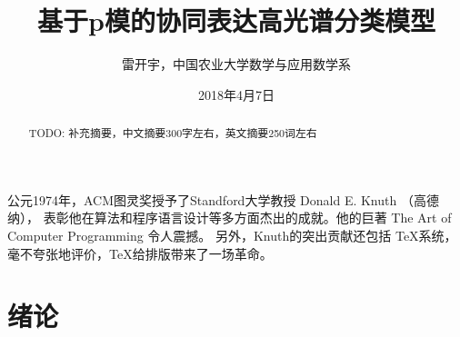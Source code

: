 \documentclass[12pt,a4paper]{article}
\begin{document}
\newtheorem{example}{例}             %
\newtheorem{theorem}{定理}[section]  %
\newtheorem{definition}{定义}
\newtheorem{axiom}{公理}
\newtheorem{property}{性质}
\newtheorem{proposition}{命题}
\newtheorem{lemma}{引理}
\newtheorem{corollary}{推论}
\newtheorem{remark}{注解}
\newtheorem{condition}{条件}
\newtheorem{conclusion}{结论}
\newtheorem{assumption}{假设}

\renewcommand{\contentsname}{目录}     %
\renewcommand{\abstractname}{摘要}     %
\renewcommand{\refname}{参考文献}      %
\renewcommand{\indexname}{索引}
\renewcommand{\figurename}{图}
\renewcommand{\tablename}{表}
\renewcommand{\appendixname}{附录}
\renewcommand{\proofname}{证明}
\renewcommand{\algorithmicrequire}{ \textbf{输入:}} %
\renewcommand{\algorithmicensure}{ \textbf{输出:}} %
\renewcommand{\algorithmicrepeat}{ \textbf{循环:}} 
\renewcommand{\algorithmicuntil}{ \textbf{循环停止条件:}} 

\title{基于p模的协同表达高光谱分类模型}
\author{雷开宇，中国农业大学数学与应用数学系}
\date{2018年4月7日}
\maketitle                            %
\tableofcontents                      %
\thispagestyle{empty}                 %

\begin{abstract}
\noindent TODO: 补充摘要，中文摘要300字左右，英文摘要250词左右
\end{abstract}

公元1974年，ACM图灵奖授予了Standford大学教授 Donald E. Knuth （高德纳），
表彰他在算法和程序语言设计等多方面杰出的成就。他的巨著 The Art of Computer Programming 令人震撼。
另外，Knuth的突出贡献还包括 \TeX 系统，毫不夸张地评价，\TeX 给排版带来了一场革命。




\section{绪论}
\indent   %
\end{document}
